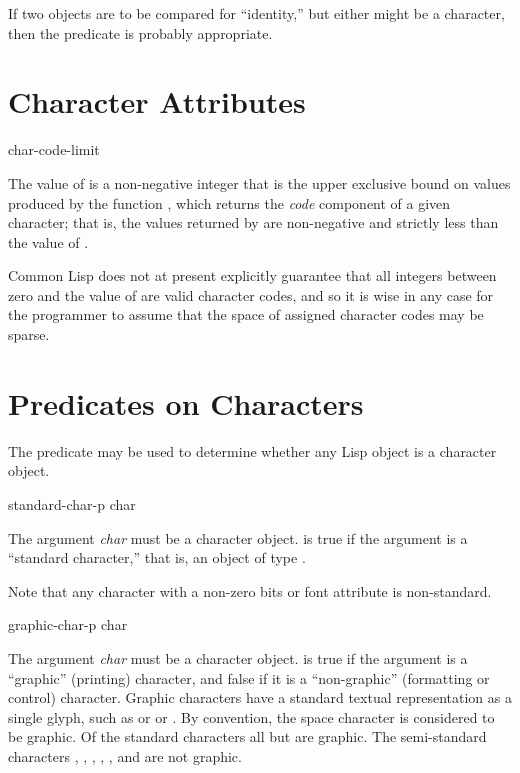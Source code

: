 If two objects are to be compared for ``identity,'' but either might be
a character, then the predicate  is probably appropriate.

\section{Character Attributes}

\begin{defun}[Constant]
char-code-limit

The value of  is a non-negative
integer that is the upper exclusive bound on values produced
by the function , which returns the \emph{code} component
of a given character; that is, the values returned by 
are non-negative and strictly less than the value of
.

Common Lisp does not at present explicitly guarantee that all integers between
zero and the value of  are valid character codes, and so
it is wise in any case for the programmer to assume that the space of
assigned character codes may be sparse.
\end{defun}

\section{Predicates on Characters}

The predicate  may be used to determine
whether any Lisp object is a character object.

\begin{defun}[Function]
standard-char-p char

The argument \emph{char} must be a character object.
 is true if the argument is a ``standard character,''
that is, an object of type .

Note that any character with a non-zero bits or
font attribute is non-standard.
\end{defun}

\begin{defun}[Function]
graphic-char-p char

The argument \emph{char} must be a character object.
 is true if the argument is a ``graphic'' (printing)
character, and false if it is a ``non-graphic'' (formatting or control)
character.  Graphic characters have a standard textual representation
as a single glyph, such as  or \cdf{*} or \cdf{=}.
By convention, the space character is considered to be graphic.
Of the standard characters
all but  are graphic.
The semi-standard characters
, , , , ,
and  are not graphic.
\end{defun}


